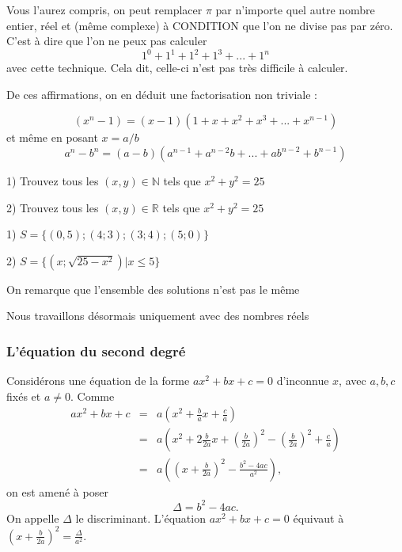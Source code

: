Vous l'aurez compris, on peut remplacer $\pi$ par n'importe quel autre nombre entier, réel et (même complexe) à CONDITION que l'on ne divise pas par zéro. C'est à dire que l'on ne peux pas calculer $$1^0+1^1+1^2+1^3+...+1^n$$ avec cette technique. Cela dit, celle-ci n'est pas très difficile à calculer. 

De ces affirmations, on en déduit une factorisation non triviale : 
\begin{prop}
	$$(x^n-1)= (x-1)(1+x+x^2+x^3+...+x^{n-1})$$
	et même en posant $x=a/b$
	$$a^n - b^n= (a-b)(a^{n-1}+a^{n-2}b+...+ab^{n-2}+b^{n-1})$$
\end{prop}

 
 \begin{exo}
 	1) Trouvez tous les $(x,y)\in \mathbb{N}$ tels que $x^2+y^2 = 25$
 	
 	2) Trouvez tous les $(x,y)\in \mathbb{R}$ tels que $x^2+y^2 = 25$
 \end{exo}
 
 \par \medskip
 
 \begin{sol}
 	
 	1) $S=\{(0,5);(4;3);(3;4);(5;0)\}$
 	
 	2) $S=\{(x;\sqrt{25-x^2}) | x \leq 5\}$
 	
On remarque que l'ensemble des solutions n'est pas le même
 \end{sol}
 
Nous travaillons désormais uniquement avec des nombres réels

\subsubsection{L'\'equation du second degr\'e}
Consid\'erons une \'equation de la forme $ax^2+bx+c=0$ d'inconnue $x$, avec $a,b,c$ fix\'es et $a\ne 0$.
Comme
\begin{eqnarray*}
 ax^2+bx+c &=& a\left(x^2+\frac{b}{a}x+\frac{c}{a}\right)\\
&=& a \left(x^2+2\frac{b}{2a}x+(\frac{b}{2a})^2-(\frac{b}{2a})^2+\frac{c}{a}\right)\\
&=& a \left((x+\frac{b}{2a})^2-\frac{b^2-4ac}{a^2}\right),
\end{eqnarray*}
on est amen\'e \`a poser
$$\Delta=b^2-4ac.$$
On appelle $\Delta$ le discriminant. L'\'equation $ax^2+bx+c=0$ \'equivaut \`a $(x+\frac{b}{2a})^2=\frac{\Delta}{a^2}$.
\par\medskip

